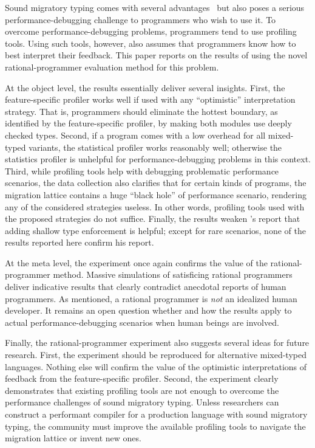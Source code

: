 

Sound migratory typing comes with several advantages~\cite{lgfd-icfp-2021,
lgfd-icfp-2023} but also poses a serious performance-debugging challenge to
programmers who wish to use it. To overcome performance-debugging problems,
programmers tend to use profiling tools. Using such tools, however, also assumes
that programmers know how to best interpret their feedback. This paper reports
on the results of using the novel rational-programmer evaluation method for this
problem.

At the object level, the results essentially deliver several insights. First,
the feature-specific profiler works well if used with any ``optimistic''
interpretation strategy. That is, programmers should eliminate the hottest
boundary, as identified by the feature-specific profiler, by making both modules
use deeply checked types. Second, if a program comes with a low overhead for all
mixed-typed variants, the statistical profiler works reasonably well;
otherwise the statistics profiler is unhelpful for performance-debugging
problems in this context. Third, while profiling tools help with debugging
problematic performance scenarios, the data collection also clarifies that for
certain kinds of programs, the migration lattice contains a huge ``black hole''
of performance scenario, rendering any of the considered strategies
useless. In other words, profiling tools used with the proposed strategies do
not suffice. Finally, the results weaken \citet{g-deep-shallow}'s report that
adding shallow type enforcement is helpful; except for rare scenarios, none of
the results reported here confirm his report.

At the meta level, the experiment once again confirms the value of the
rational-programmer method. Massive simulations of satisficing rational
programmers deliver indicative results that clearly contradict anecdotal reports
of human programmers. As mentioned, a rational programmer is {\em not\/} an
idealized human developer. It remains an open question whether and how the
results apply to actual performance-debugging scenarios when human beings are
involved.

Finally, the rational-programmer experiment also suggests several ideas for
future research. First, the experiment should be reproduced for alternative
mixed-typed languages. Nothing else will confirm the value of the optimistic
interpretations of feedback from the feature-specific profiler. Second, the
experiment clearly demonstrates that existing profiling tools are not enough to
overcome the performance challenges of sound migratory typing. Unless researchers
can construct a performant compiler for a production language with sound migratory 
typing, the community must improve the available profiling tools to navigate the
migration lattice or invent new ones.



